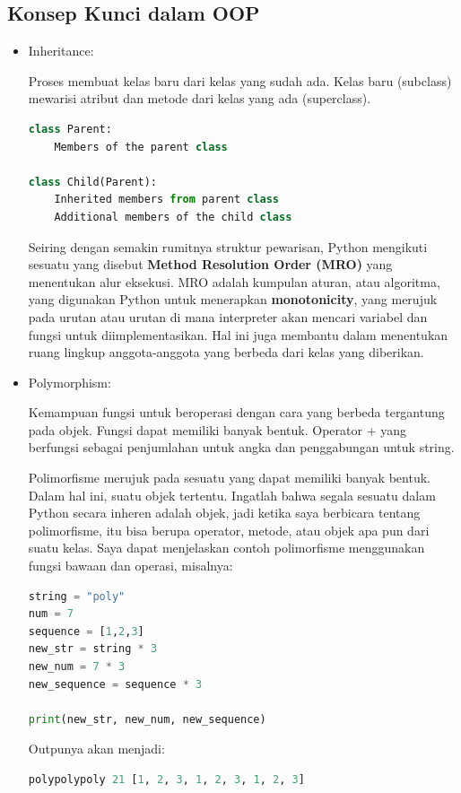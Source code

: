 \documentclass{article}
\begin{document}
\subsection{Konsep Kunci dalam OOP}
\begin{itemize}
    \item Inheritance:

          Proses membuat kelas baru dari kelas yang sudah ada. Kelas baru (subclass) mewarisi atribut dan metode dari kelas yang ada (superclass).

          \begin{lstlisting}[language=Python, caption={}, captionpos=b]
class Parent:
    Members of the parent class

class Child(Parent):
    Inherited members from parent class
    Additional members of the child class
          \end{lstlisting}

          Seiring dengan semakin rumitnya struktur pewarisan, Python mengikuti sesuatu yang disebut \textbf{Method Resolution Order (MRO)} yang menentukan alur eksekusi. MRO adalah kumpulan aturan, atau algoritma, yang digunakan Python untuk menerapkan \textbf{monotonicity}, yang merujuk pada urutan atau urutan di mana interpreter akan mencari variabel dan fungsi untuk diimplementasikan. Hal ini juga membantu dalam menentukan ruang lingkup anggota-anggota yang berbeda dari kelas yang diberikan.

    \item Polymorphism:

          Kemampuan fungsi untuk beroperasi dengan cara yang berbeda tergantung pada objek. Fungsi dapat memiliki banyak bentuk. Operator + yang berfungsi sebagai penjumlahan untuk angka dan penggabungan untuk string.

          Polimorfisme merujuk pada sesuatu yang dapat memiliki banyak bentuk. Dalam hal ini, suatu objek tertentu. Ingatlah bahwa segala sesuatu dalam Python secara inheren adalah objek, jadi ketika saya berbicara tentang polimorfisme, itu bisa berupa operator, metode, atau objek apa pun dari suatu kelas. Saya dapat menjelaskan contoh polimorfisme menggunakan fungsi bawaan dan operasi, misalnya:

          \begin{lstlisting}[language=Python, caption={}, captionpos=b]
string = "poly"
num = 7
sequence = [1,2,3]
new_str = string * 3
new_num = 7 * 3
new_sequence = sequence * 3

print(new_str, new_num, new_sequence)
          \end{lstlisting}
          Outpunya akan menjadi:
          \begin{lstlisting}[language=Python, caption={}, captionpos=b]
polypolypoly 21 [1, 2, 3, 1, 2, 3, 1, 2, 3]
          \end{lstlisting}


\end{itemize}
\end{document}
